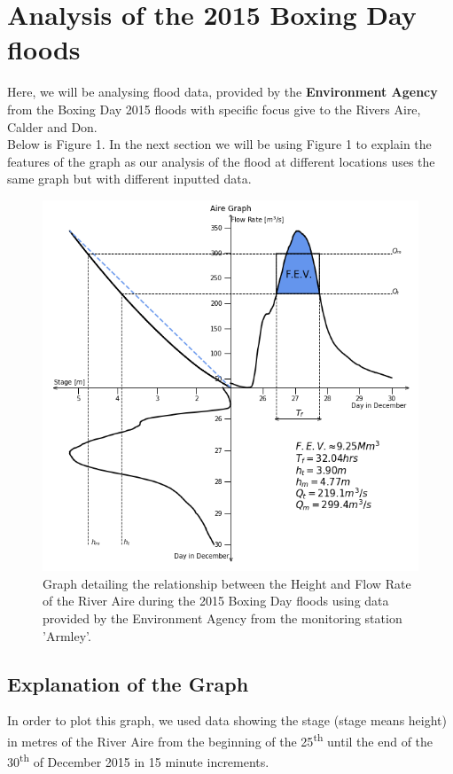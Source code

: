 \documentclass[11 pt, a4paper]{article}
\begin{document}
\newpage
\section{Analysis of the 2015 Boxing Day floods}
Here, we will be analysing flood data, provided by the {\bf Environment Agency} from the Boxing Day 2015 floods with specific focus give to the Rivers Aire, Calder and Don.\\
Below is Figure 1. In the next section we will be using Figure 1 to explain the features of the graph as our analysis of the flood at different locations uses the same graph but with different inputted data.
\begin{figure}[H]
\begin{center}
\includegraphics[width=.5\linewidth]{Aire-Quadrant_Graph.png}
\caption{Graph detailing the relationship between the Height and Flow Rate of the River Aire during the 2015 Boxing Day floods using data provided by the Environment Agency from the monitoring station 'Armley'.}
\end{center}
\end{figure}

\subsection{Explanation of the Graph}
In order to plot this graph, we used data showing the stage (stage means height) in metres of the River Aire from the beginning of the 25\textsuperscript{th} until the end of the 30\textsuperscript{th} of December 2015 in 15 minute increments.\\ 
\end{document}
